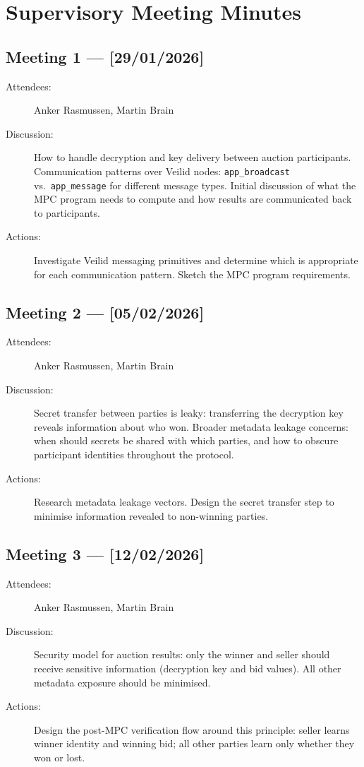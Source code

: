 \section{Supervisory Meeting Minutes}
\label{app:minutes}


\subsection*{Meeting 1 — [29/01/2026]}
\begin{description}
  \item[Attendees:] Anker Rasmussen, Martin Brain
  \item[Discussion:] How to handle decryption and key delivery between
    auction participants.  Communication patterns over Veilid nodes:
    \texttt{app\_broadcast} vs.\ \texttt{app\_message} for different message
    types.  Initial discussion of what the MPC program needs to compute
    and how results are communicated back to participants.
  \item[Actions:] Investigate Veilid messaging primitives and determine
    which is appropriate for each communication pattern.  Sketch the MPC
    program requirements.
\end{description}

\subsection*{Meeting 2 — [05/02/2026]}
\begin{description}
  \item[Attendees:] Anker Rasmussen, Martin Brain
  \item[Discussion:] Secret transfer between parties is leaky: transferring
    the decryption key reveals information about who won.  Broader metadata
    leakage concerns: when should secrets be shared with which parties, and
    how to obscure participant identities throughout the protocol.
  \item[Actions:] Research metadata leakage vectors.  Design the secret
    transfer step to minimise information revealed to non-winning parties.
\end{description}
\subsection*{Meeting 3 — [12/02/2026]}
\begin{description}
  \item[Attendees:] Anker Rasmussen, Martin Brain
  \item[Discussion:] Security model for auction results: only the winner and
    seller should receive sensitive information (decryption key and bid values).
    All other metadata exposure should be minimised.
  \item[Actions:] Design the post-MPC verification flow around this principle:
    seller learns winner identity and winning bid; all other parties learn only
    whether they won or lost.
\end{description}
